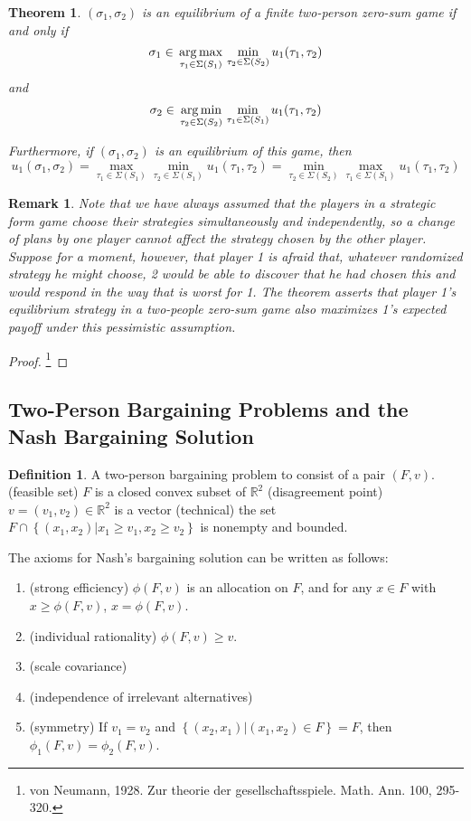 \documentclass{article}
\newtheorem{Thm}{Theorem}[section]
\newtheorem*{Rk}{Remark}
\theoremstyle{definition}
\newtheorem{Def}{Definition}[section]
\begin{document}
\begin{Thm}
    $(\sigma_1,\sigma_2)$ is an equilibrium of a finite two-person zero-sum game if and only if 
    \[ \sigma_1\in\sideset{}{}{\arg\max}_{\tau_1\in \Sigma(S_1)}\sideset{}{}\min_{\tau_2\in\Sigma(S_2)} u_1(\tau_1,\tau_2)\] 
    and \[\sigma_2\in\sideset{}{}{\arg\min}_{\tau_2\in \Sigma(S_2)}\sideset{}{}\min_{\tau_1\in\Sigma(S_1)} u_1(\tau_1,\tau_2)\] 
    \par 
    Furthermore, if $(\sigma_1,\sigma_2)$ is an equilibrium of this game, then 
    \[u_1(\sigma_1,\sigma_2)=\max_{\tau_1\in\Sigma(S_1)}\min_{\tau_2\in\Sigma(S_1)}u_1(\tau_1,\tau_2)=\min_{\tau_2\in\Sigma(S_2)}\max_{\tau_1\in\Sigma(S_1)}u_1(\tau_1,\tau_2)\]

\end{Thm}
\begin{Rk}
    Note that we have always assumed that the players
    in a strategic form game choose their strategies simultaneously and independently, so a change of plans by
    one player cannot affect the strategy chosen by the other player. Suppose for a moment, however, that player 1
    is afraid that, whatever randomized strategy he might choose, 2 would be able to discover that he had chosen this
    and would respond in the way that is worst for 1. The theorem asserts that player 1's equilibrium strategy in a
    two-people zero-sum game also maximizes 1's expected payoff under this pessimistic assumption.
\end{Rk}
\begin{proof}
    \footnote{von Neumann, 1928. Zur theorie der gesellschaftsspiele. Math. Ann. 100, 295-320. }
\end{proof}

\subsection{Two-Person Bargaining Problems and the Nash Bargaining Solution}
\begin{Def}
    A two-person bargaining problem to consist of a pair $(F,v)$.\newline 
    (feasible set) $F$ is a closed convex subset of $\mathbb{R}^2$\newline 
    (disagreement point) $v=(v_1,v_2)\in\mathbb{R}^2$ is a vector\newline 
    (technical) the set $F\cap\left\{(x_1,x_2)|x_1\ge v_1,x_2\ge v_2\right\}$ is nonempty and bounded.
\end{Def}

The axioms for Nash's bargaining solution can be written as follows:
\begin{enumerate}
    \item (strong efficiency) $\phi(F,v)$ is an allocation on $F$, and for any $x\in F$ with $x\ge \phi(F,v)$, $x=\phi(F,v)$.
    \item (individual rationality) $\phi(F,v)\ge v$.
    \item (scale covariance)
    \item (independence of irrelevant alternatives)
    \item (symmetry) If $v_1=v_2$ and $\left\{(x_2,x_1)|(x_1,x_2)\in F\right\}=F$, then $\phi_1(F,v)=\phi_2(F,v)$.
\end{enumerate}
\end{document}
